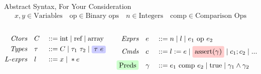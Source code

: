 \documentclass[aspectratio=169]{beamer}
\begin{document}
\begin{frame}{Abstract Syntax, For Your Consideration}
\begin{gather*}
    x,y \in \text{Variables}
    \quad
    \text{op} \in \text{Binary ops}
    \quad
    n \in \text{Integers}
    \quad
    \text{comp} \in \text{Comparison Ops}
\end{gather*}

\vspace{0.2in}

\begin{columns}[T]
\begin{column}{0.45\textwidth}
\begin{alignat*}{2}
\textit{Ctors}\quad &C &&::= \text{int} \altm \text{ref} \altm \text{array}
\\
\textit{Types}\quad &\tau &&::= C \altm \tau_1 \ \tau_2 \altm \colorIt{blue}{n1}{\tau\ e}
\\
\textit{L-exprs} \quad &l &&::= x \altm *e
\end{alignat*}
\end{column}

\pause

\begin{column}{0.45\textwidth}
\begin{alignat*}{2}
\textit{Exprs}\quad &e &&::= n \altm l \altm e_1 \text{ op } e_2
\\
\textit{Cmds}\quad &c &&::= l := e \altm \colorIt{red}{n2}{\text{assert}(\gamma)} \altm c_1;c_2 \altm ...
\\
\colorIt{green}{n3}{\text{Preds}} \quad &\gamma &&::= e_1 \text{ comp } e_2 \altm \text{true} \altm \gamma_1 \wedge \gamma_2
\end{alignat*}
\end{column}
\end{columns}

\vspace{0.1in}
\end{frame}

\end{document}
